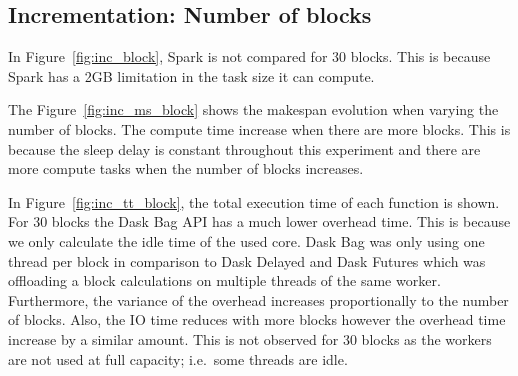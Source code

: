 \documentclass[conference]{IEEEtran}
\begin{document}
\subsection{Incrementation: Number of blocks}
In Figure~\ref{fig:inc_block}, Spark is not compared for 30 blocks. This is because
Spark has a 2GB limitation in the task size it can compute.

The Figure~\ref{fig:inc_ms_block} shows the makespan evolution when varying the
number of blocks. The compute time increase when there are more blocks. This is
because the sleep delay is constant throughout this experiment and there are more
compute tasks when the number of blocks increases.

In Figure~\ref{fig:inc_tt_block}, the total execution time of each function is shown.
For 30 blocks the Dask Bag API has a much lower overhead time. This is because we
only calculate the idle time of the used core. Dask Bag was only using one thread per
block in comparison to Dask Delayed and Dask Futures which was offloading a block
calculations on multiple threads of the same worker. Furthermore, the variance of the
overhead increases proportionally to the number of blocks. Also, the IO time reduces
with more blocks however the overhead time increase by a similar amount. This is not
observed for 30 blocks as the workers are not used at full capacity; i.e.\ some
threads are idle.
\end{document}
